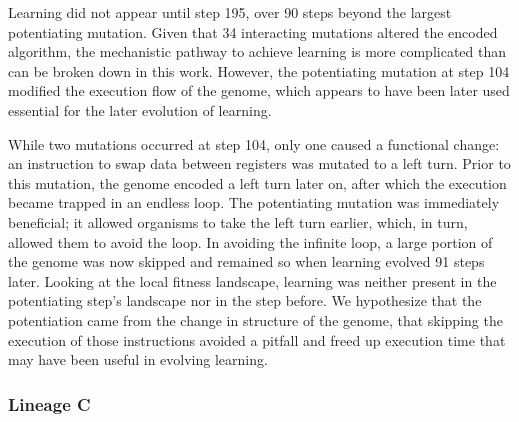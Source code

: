Learning did not appear until step 195, over 90 steps beyond the largest potentiating mutation. 
Given that 34 interacting mutations altered the encoded algorithm, the mechanistic pathway to achieve learning is more complicated than can be broken down in this work.
However, the potentiating mutation at step 104 modified the execution flow of the genome, which appears to have been later used essential for the later evolution of learning.%

While two mutations occurred at step 104, only one caused a functional change: an instruction to swap data between registers was mutated to a left turn. 
Prior to this mutation, the genome encoded a left turn later on, after which the execution became trapped in an endless loop. 
The potentiating mutation was immediately beneficial; it allowed organisms to take the left turn earlier, which, in turn, allowed them to avoid the loop. 
In avoiding the infinite loop, a large portion of the genome was now skipped and remained so when learning evolved 91 steps later. 
Looking at the local fitness landscape, learning was neither present in the potentiating step's landscape nor in the step before.
We hypothesize that the potentiation came from the change in structure of the genome, that skipping the execution of those instructions avoided a pitfall and freed up execution time that may have been useful in evolving learning.



\subsubsection{Lineage C}

